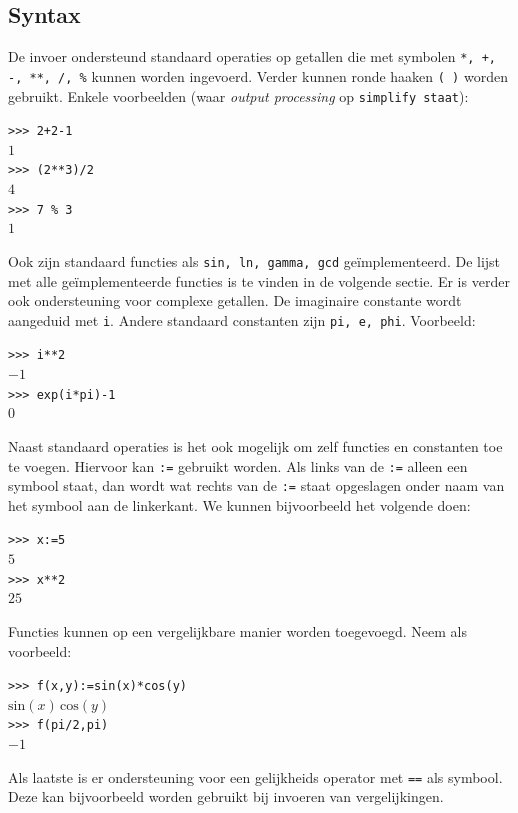 \documentclass[a4paper]{article}
\newcommand{\ttt}[1]{\texttt{#1}}
\begin{document}
\subsection{Syntax}
De invoer ondersteund standaard operaties op getallen die met symbolen \texttt{*, +, -, **, /, \%} kunnen worden ingevoerd. Verder kunnen ronde haaken \texttt{( )} worden gebruikt. Enkele voorbeelden (waar \textit{output processing} op \ttt{simplify staat}):
\begin{adjustwidth}{1.5cm}{}
\texttt{>>> 2+2-1}\\
$1$\\
\texttt{>>> (2**3)/2}\\
$4$\\
\texttt{>>> 7 \% 3}\\
$1$
\end{adjustwidth}
Ook zijn standaard functies als \texttt{sin, ln, gamma, gcd} ge\"implementeerd. %
De lijst met alle ge\"implementeerde functies is te vinden in de volgende sectie. Er is verder ook ondersteuning voor complexe getallen. De imaginaire constante wordt aangeduid met \texttt{i}. Andere standaard constanten zijn \texttt{pi, e, phi}. Voorbeeld:
\begin{adjustwidth}{1.5cm}{}
\texttt{>>> i**2}\\
$-1$\\
\texttt{>>> exp(i*pi)-1}\\
$0$
\end{adjustwidth}
Naast standaard operaties is het ook mogelijk om zelf functies en constanten toe te voegen. Hiervoor kan \texttt{:=} gebruikt worden. Als links van de \texttt{:=} alleen een symbool staat, dan wordt wat rechts van de \texttt{:=} staat opgeslagen onder naam van het symbool aan de linkerkant. We kunnen bijvoorbeeld het volgende doen:
\begin{adjustwidth}{1.5cm}{}
\texttt{>>> x:=5}\\
$5$\\
\texttt{>>> x**2}\\
$25$
\end{adjustwidth}
Functies kunnen op een vergelijkbare manier worden toegevoegd. Neem als voorbeeld:
\begin{adjustwidth}{1.5cm}{}
\texttt{>>> f(x,y):=sin(x)*cos(y)}\\
$\mathrm{sin}(x)\,\mathrm{cos}(y)$\\
\texttt{>>> f(pi/2,pi)}\\
$-1$
\end{adjustwidth}
Als laatste is er ondersteuning voor een gelijkheids operator met \texttt{==} als symbool. Deze kan bijvoorbeeld worden gebruikt bij invoeren van vergelijkingen. 
\end{document}
